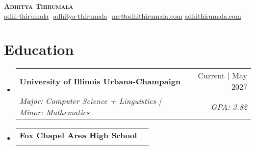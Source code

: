 \documentclass{article}
\makeatletter
\newcommand{\resumeSubheading}[4]{
  \vspace{-2pt}\item
    \begin{tabular*}{0.97\textwidth}[t]{l@{\extracolsep{\fill}}r}
      \textbf{#1} & #2 \\
      \textit{\small#3} & \textit{\small #4} \\
    \end{tabular*}\vspace{-7pt}
}
\newcommand{\resumeSubHeadingListStart}{\begin{itemize}[leftmargin=0.15in, label={}]}
\newcommand{\resumeSubHeadingListEnd}{\end{itemize}}
\makeatother
\begin{document}
\begin{flushright}
	\vspace{-4pt}
	\color{gray}
\end{flushright}

\vspace{-7pt}

\begin{center}
	\textbf{{\Huge\scshape Adhitya Thirumala}} \\ \vspace{8pt}
	\small
	\href{https://github.com/adhi-thirumala}{\underline{adhi-thirumala}} $  $
	\href{https://www.linkedin.com/in/adhitya-thirumala}
	{\underline{adhitya-thirumala}} $  $
	\href{mailto:me@adhithirumala.com}
	{\underline{me@adhithirumala.com}}
	\href{https://www.adhithirumala.com}
	{\underline{adhithirumala.com}} $  $
   $  $



\end{center}

\section{Education}
\resumeSubHeadingListStart

\resumeSubheading{University of Illinois Urbana-Champaign} {Current | May 2027} {Major: Computer Science + Linguistics | Minor: Mathematics}{GPA: 3.82}
\vspace{1pt}

\resumeSubheading
{Fox Chapel Area High School}{}
{}{}
\resumeSubHeadingListEnd
\vspace{-15pt}


\end{document}
